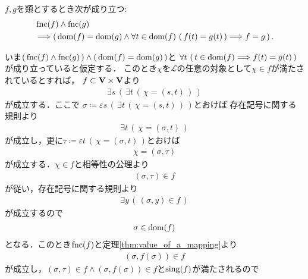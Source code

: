 	\begin{screen}
		\begin{thm}[定義域と値が一致する写像は等しい]
		\label{thm:two_functions_with_same_domain_and_values_coincide}
			$f,g$を類とするとき次が成り立つ:
			\begin{align}
				&\operatorname*{fnc} (f) \wedge \operatorname*{fnc} (g) \\
				&\Longrightarrow  
				\left(\, \operatorname*{dom} (f) = \operatorname*{dom} (g) \wedge
				\forall t \in \operatorname*{dom} (f)\, \left(\, f(t) = g(t)\, \right) \Longrightarrow f = g\, \right).
			\end{align}
		\end{thm}
	\end{screen}
	
	\begin{prf}
		いま$\left(\, \operatorname*{fnc} (f) \wedge \operatorname*{fnc} (g)\, \right) \wedge \left(\, \operatorname*{dom} (f) = \operatorname*{dom} (g)\, \right)$と
		$\forall t\, \left(\, t \in \operatorname*{dom} (f) \Longrightarrow f(t) = g(t)\, \right)$が成り立っていると仮定する．
		このとき$\chi$を$\mathcal{L}$の任意の対象として$\chi \in f$が満たされているとすれば，
		$f \subset \mathbf{V} \times \mathbf{V}$より
		\begin{align}
			\exists s\, \left(\, \exists t\, (\, \chi = (s,t)\, )\, \right)
		\end{align}
		が成立する．ここで
		$\sigma \coloneqq \varepsilon s\, \left(\, \exists t\, (\, \chi = (s,t)\, )\, \right)$とおけば
		存在記号に関する規則より
		\begin{align}
			\exists t\, (\, \chi = (\sigma,t)\, )
		\end{align}
		が成立し，更に$\tau \coloneqq \varepsilon t\, (\, \chi = (\sigma,t)\, )$とおけば
		\begin{align}
			\chi = (\sigma,\tau)
		\end{align}
		が成立する．$\chi \in f$と相等性の公理より
		\begin{align}
			(\sigma,\tau) \in f
		\end{align}
		が従い，存在記号に関する規則より
		\begin{align}
			\exists y\, (\, (\sigma,y) \in f\, )
		\end{align}
		が成立するので
		\begin{align}
			\sigma \in \operatorname*{dom} (f)
		\end{align}
		となる．このとき$\operatorname*{fnc} (f)$と定理\ref{thm:value_of_a_mapping}より
		\begin{align}
			(\sigma,f(\sigma)) \in f
		\end{align}
		が成立し，$(\sigma,\tau) \in f \wedge (\sigma,f(\sigma)) \in f$と$\operatorname*{sing} (f)$が満たされるので

\end{prf}
